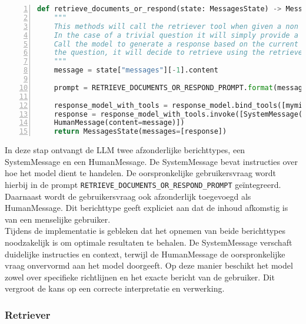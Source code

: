 \begin{lstlisting}[basicstyle=\small, frame=single, breaklines=true, postbreak=\mbox{\textcolor{red}{$\hookrightarrow$}\space}, escapeinside ={\%,}, escapechar={!}, numbers=left, language=Python, caption=Functie die beslist tussen direct antwoord en documentopvraging]
def retrieve_documents_or_respond(state: MessagesState) -> MessagesState:
    """
    This methods will call the retriever tool when given a non trivial question is asked.
    In the case of a trivial question it will simply provide a response
    Call the model to generate a response based on the current state. Given
    the question, it will decide to retrieve using the retriever tool, or simply respond to the user.
    """
    message = state["messages"][-1].content
    
    prompt = RETRIEVE_DOCUMENTS_OR_RESPOND_PROMPT.format(message=message)
    
    response_model_with_tools = response_model.bind_tools([myminfin_retriever_tool])
    response = response_model_with_tools.invoke([SystemMessage(content=prompt),
    HumanMessage(content=message)])
    return MessagesState(messages=[response])
\end{lstlisting}

In deze stap ontvangt de LLM twee afzonderlijke berichttypes, een SystemMessage en een HumanMessage. De SystemMessage bevat instructies over hoe het model dient te handelen. De oorspronkelijke gebruikersvraag wordt hierbij in de prompt \verb|RETRIEVE_DOCUMENTS_OR_RESPOND_PROMPT| geïntegreerd.
\\[1em]
Daarnaast wordt de gebruikersvraag ook afzonderlijk toegevoegd als HumanMessage. Dit berichttype geeft expliciet aan dat de inhoud afkomstig is van een menselijke gebruiker.
\\[1em]
Tijdens de implementatie is gebleken dat het opnemen van beide berichttypes noodzakelijk is om optimale resultaten te behalen. De SystemMessage verschaft duidelijke instructies en context, terwijl de HumanMessage de oorspronkelijke vraag onvervormd aan het model doorgeeft. Op deze manier beschikt het model zowel over specifieke richtlijnen en het exacte bericht van de gebruiker. Dit vergroot de kans op een correcte interpretatie en verwerking.

\subsubsection{Retriever}

